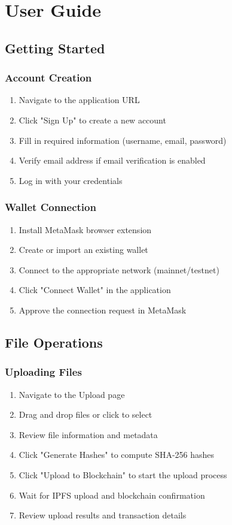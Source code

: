 \documentclass[11pt,a4paper]{article}
\begin{document}
\section{User Guide}

\subsection{Getting Started}

\subsubsection{Account Creation}
\begin{enumerate}
    \item Navigate to the application URL
    \item Click "Sign Up" to create a new account
    \item Fill in required information (username, email, password)
    \item Verify email address if email verification is enabled
    \item Log in with your credentials
\end{enumerate}

\subsubsection{Wallet Connection}
\begin{enumerate}
    \item Install MetaMask browser extension
    \item Create or import an existing wallet
    \item Connect to the appropriate network (mainnet/testnet)
    \item Click "Connect Wallet" in the application
    \item Approve the connection request in MetaMask
\end{enumerate}

\subsection{File Operations}

\subsubsection{Uploading Files}
\begin{enumerate}
    \item Navigate to the Upload page
    \item Drag and drop files or click to select
    \item Review file information and metadata
    \item Click "Generate Hashes" to compute SHA-256 hashes
    \item Click "Upload to Blockchain" to start the upload process
    \item Wait for IPFS upload and blockchain confirmation
    \item Review upload results and transaction details
\end{enumerate}
\end{document}
